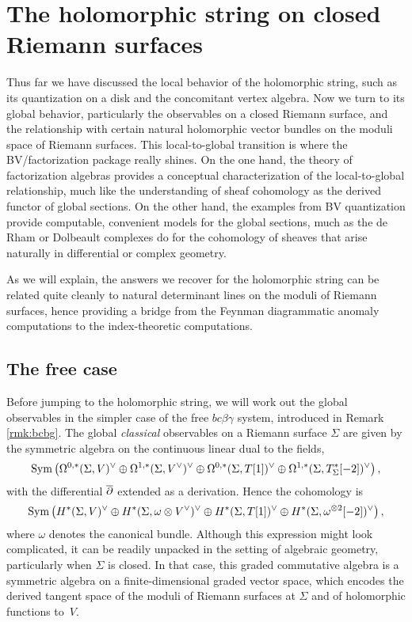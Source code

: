 \section{The holomorphic string on closed Riemann surfaces} 
\label{sec: conformalblock}

Thus far we have discussed the local behavior of the holomorphic string,
such as its quantization on a disk and the concomitant vertex algebra.
Now we turn to its global behavior, 
particularly the observables on a closed Riemann surface,
and the relationship with certain natural holomorphic vector bundles on the moduli space of Riemann surfaces.
This local-to-global transition is where the BV/factorization package really shines.
On the one hand, the theory of factorization algebras provides a conceptual characterization of the local-to-global relationship,
much like the understanding of sheaf cohomology as the derived functor of global sections.
On the other hand, the examples from BV quantization provide computable, convenient models for the global sections,
much as the de Rham or Dolbeault complexes do for the cohomology of sheaves that arise naturally in differential or complex geometry.

As we will explain, the answers we recover for the holomorphic string can be related quite cleanly to natural determinant lines on the moduli of Riemann surfaces,
hence providing a bridge from the Feynman diagrammatic anomaly computations to the index-theoretic computations.

\subsection{The free case}

Before jumping to the holomorphic string, 
we will work out the global observables in the simpler case of the free $bc\beta\gamma$ system,
introduced in Remark \ref{rmk:bcbg}. 
The global {\it classical}\/ observables on a Riemann surface $\Sigma$ are given by the symmetric algebra on the continuous linear dual to the fields,
\[
{\rm Sym}\left(\Omega^{0,*}(\Sigma,V)^\vee \oplus \Omega^{1,*}(\Sigma,V^\vee)^\vee \oplus \Omega^{0,*}(\Sigma,T[1])^\vee \oplus \Omega^{1,*}(\Sigma,T^*_\Sigma[-2])^\vee \right),
\]
with the differential $\overline{\partial}$ extended as a derivation.
Hence the cohomology is
\[
{\rm Sym}\left(H^*(\Sigma,V)^\vee \oplus H^*(\Sigma,\omega \otimes V^\vee)^\vee \oplus H^*(\Sigma,T[1])^\vee \oplus H^*(\Sigma,\omega^{\otimes 2}[-2])^\vee\right),
\]
where $\omega$ denotes the canonical bundle.
Although this expression might look complicated, 
it can be readily unpacked in the setting of algebraic geometry, 
particularly when $\Sigma$ is closed.
In that case, this graded commutative algebra is a symmetric algebra on a finite-dimensional graded vector space,
which encodes the derived tangent space of the moduli of Riemann surfaces at $\Sigma$ and of holomorphic functions to~$V$. 

